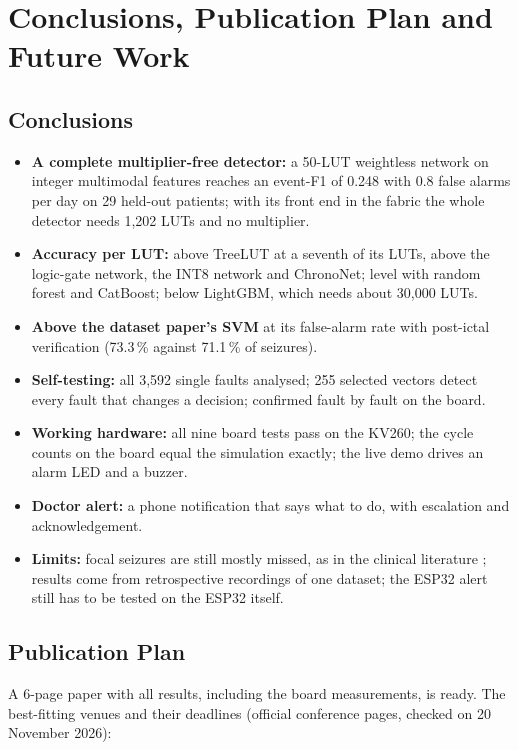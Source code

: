 \chapter{Conclusions, Publication Plan and Future Work}\label{ch:concl}

\section{Conclusions}

\begin{itemize}
\item \textbf{A complete multiplier-free detector:} a 50-LUT weightless network on integer multimodal features
  reaches an event-F1 of 0.248 with 0.8 false alarms per day on 29 held-out patients; with its front end in the
  fabric the whole detector needs 1,202 LUTs and no multiplier.
\item \textbf{Accuracy per LUT:} above TreeLUT at a seventh of its LUTs, above the logic-gate network, the INT8 network
  and ChronoNet; level with random forest and CatBoost; below LightGBM, which needs about 30,000 LUTs.
\item \textbf{Above the dataset paper's SVM} at its false-alarm rate with post-ictal verification (73.3\,\% against
  71.1\,\% of seizures).
\item \textbf{Self-testing:} all 3,592 single faults analysed; 255 selected vectors detect every fault that changes a
  decision; confirmed fault by fault on the board.
\item \textbf{Working hardware:} all nine board tests pass on the KV260; the cycle counts on the board equal the
  simulation exactly; the live demo drives an alarm LED and a buzzer.
\item \textbf{Doctor alert:} a phone notification that says what to do, with escalation and acknowledgement.
\item \textbf{Limits:} focal seizures are still mostly missed, as in the clinical literature
  \cite{beniczky2021guideline}; results come from retrospective recordings of one dataset; the ESP32 alert still has to
  be tested on the ESP32 itself.
\end{itemize}

\section{Publication Plan}

A 6-page paper with all results, including the board measurements, is ready. The best-fitting venues and their
deadlines (official conference pages, checked on 20 November 2026):

